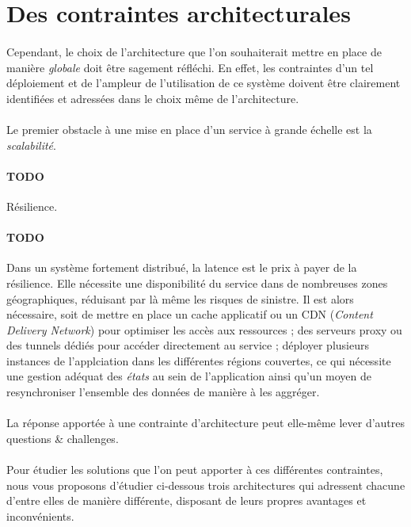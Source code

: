 \section{Des contraintes architecturales}

\paragraph{} Cependant, le choix de l'architecture que l'on souhaiterait mettre en place de manière \emph{globale} doit 
être sagement réfléchi. En effet, les contraintes d'un tel déploiement et de l'ampleur de l'utilisation de ce système
doivent être clairement identifiées et adressées dans le choix même de l'architecture.

\paragraph{} Le premier obstacle à une mise en place d'un service à grande échelle est la \emph{scalabilité}. \cite{Scalability0}

\paragraph{TODO} Résilience.

\paragraph{TODO} Dans un système fortement distribué, la latence est le prix à payer de la résilience. Elle nécessite une 
disponibilité du service dans de nombreuses zones géographiques, réduisant par là même les risques de sinistre. Il est alors
nécessaire, soit de mettre en place un cache applicatif ou un CDN (\emph{Content Delivery Network}) pour optimiser les 
accès aux ressources ; des serveurs proxy ou des tunnels dédiés pour accéder directement au service ; déployer plusieurs
instances de l'applciation dans les différentes régions couvertes, ce qui nécessite une gestion adéquat des \emph{états}
au sein de l'application ainsi qu'un moyen de resynchroniser l'ensemble des données de manière à les aggréger.

\paragraph{} La réponse apportée à une contrainte d'architecture peut elle-même lever d'autres questions \& challenges.

\paragraph{} Pour étudier les solutions que l'on peut apporter à ces différentes contraintes, nous vous proposons d'étudier
ci-dessous trois architectures qui adressent chacune d'entre elles de manière différente, disposant de leurs propres
avantages et inconvénients.


